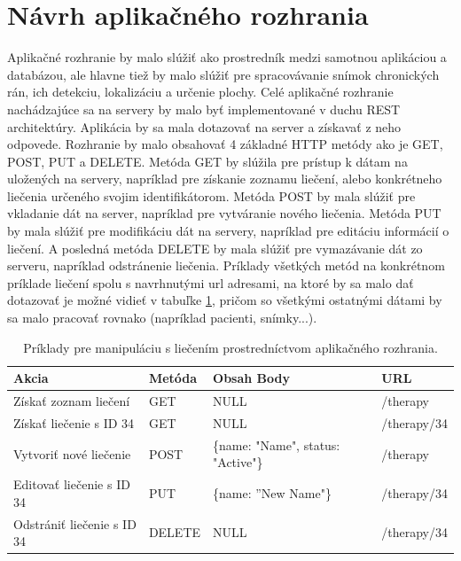 \section{Návrh aplikačného rozhrania}
Aplikačné rozhranie by malo slúžiť ako prostredník medzi samotnou aplikáciou a databázou, ale hlavne tiež by malo slúžiť pre spracovávanie snímok chronických rán, ich detekciu, lokalizáciu a určenie plochy. Celé aplikačné rozhranie nachádzajúce sa na servery by malo byť implementované v duchu REST architektúry. Aplikácia by sa mala dotazovať na server a získavať z neho odpovede. Rozhranie by malo obsahovať 4 základné HTTP metódy ako je GET, POST, PUT a DELETE. Metóda GET by slúžila pre prístup k dátam na uložených na servery, napríklad pre získanie zoznamu liečení, alebo konkrétneho liečenia určeného svojim identifikátorom. Metóda POST by mala slúžiť pre vkladanie dát na server, napríklad pre vytváranie nového liečenia. Metóda PUT by mala slúžiť pre modifikáciu dát na servery, napríklad pre editáciu informácií o liečení. A posledná metóda DELETE by mala slúžiť pre vymazávanie dát zo serveru, napríklad odstránenie liečenia. Príklady všetkých metód na konkrétnom príklade liečení spolu s navrhnutými url adresami, na ktoré by sa malo dať dotazovať je možné vidieť v tabuľke \ref{tab:rest-example}, pričom so všetkými ostatnými dátami by sa malo pracovať rovnako (napríklad pacienti, snímky...).
\begin{table}[h]
\centering
\begin{tabular}{|l|l|l|l|}
\hline
Akcia                      & Metóda & Obsah Body                         & URL         \\ \hline
Získať zoznam liečení      & GET    & NULL                               & /therapy    \\ \hline
Získať liečenie s ID 34    & GET    & NULL                               & /therapy/34 \\ \hline
Vytvoriť nové liečenie     & POST   & \{name: "Name", status: "Active"\} & /therapy    \\ \hline
Editovať liečenie s ID 34  & PUT    & \{name: ''New Name"\}              & /therapy/34  \\ \hline
Odstrániť liečenie s ID 34 & DELETE & NULL                               & /therapy/34  \\ \hline
\end{tabular}
\caption{Príklady pre manipuláciu s liečením prostredníctvom aplikačného rozhrania.}
\label{tab:rest-example}
\end{table}

